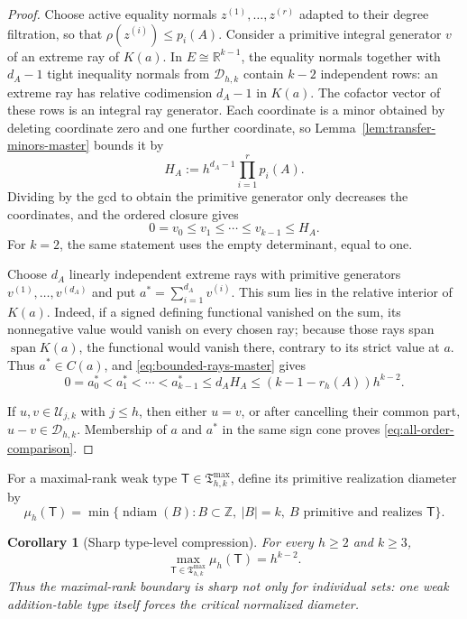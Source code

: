 \documentclass[11pt,reqno]{amsart}
\newtheorem{corollary}[theorem]{Corollary}
\theoremstyle{definition}
\theoremstyle{remark}
\newcommand{\ndiam}{\operatorname{ndiam}}
\begin{document}
\begin{proof}
Choose active equality normals $z^{(1)},\ldots,z^{(r)}$ adapted to their
degree filtration, so that $\rho(z^{(i)})\leq p_i(A)$.  Consider a primitive
integral generator $v$ of an extreme ray of $K(a)$.  In
$E\cong\mathbb R^{k-1}$, the equality normals together with $d_A-1$ tight
inequality normals from $\mathcal D_{h,k}$ contain $k-2$ independent rows:
an extreme ray has relative codimension $d_A-1$ in $K(a)$.
The cofactor vector of these rows is an integral ray generator.  Each
coordinate is a minor obtained by deleting coordinate zero and one further
coordinate, so Lemma~\ref{lem:transfer-minors-master} bounds it by
\[
 H_A:=h^{d_A-1}\prod_{i=1}^r p_i(A).
\]
Dividing by the gcd to obtain the primitive generator only decreases the
coordinates, and the ordered closure gives
\begin{equation}\label{eq:bounded-rays-master}
 0=v_0\leq v_1\leq\cdots\leq v_{k-1}\leq H_A.
\end{equation}
For $k=2$, the same statement uses the empty determinant, equal to one.

Choose $d_A$ linearly independent extreme rays with primitive generators
$v^{(1)},\ldots,v^{(d_A)}$ and put
$a^*=\sum_{i=1}^{d_A}v^{(i)}$.  This sum lies in the relative interior of
$K(a)$.  Indeed, if a signed defining functional vanished on the sum, its
nonnegative value would vanish on every chosen ray; because those rays span
$\operatorname{span}K(a)$, the functional would vanish there, contrary to
its strict value at $a$.  Thus $a^*\in C(a)$, and
\eqref{eq:bounded-rays-master} gives
\[
 0=a_0^*<a_1^*<\cdots<a_{k-1}^*
 \leq d_AH_A
 \leq(k-1-r_h(A))h^{k-2}.
\]

If $u,v\in\mathcal U_{j,k}$ with $j\leq h$, then either $u=v$, or after
cancelling their common part, $u-v\in\mathcal D_{h,k}$.  Membership of $a$
and $a^*$ in the same sign cone proves \eqref{eq:all-order-comparison}.
\end{proof}

For a maximal-rank weak type
$\mathsf T\in\mathfrak T^{\max}_{h,k}$, define its primitive realization
diameter by
\[
 \mu_h(\mathsf T)=
 \min\{\ndiam(B):B\subset\mathbb Z,\ |B|=k,\ B\text{ primitive and realizes }
 \mathsf T\}.
\]

\begin{corollary}[Sharp type-level compression]
\label{cor:sharp-type-compression}
For every $h\geq2$ and $k\geq3$,
\begin{equation}\label{eq:sharp-type-compression}
 \max_{\mathsf T\in\mathfrak T^{\max}_{h,k}}\mu_h(\mathsf T)=h^{k-2}.
\end{equation}
Thus the maximal-rank boundary is sharp not only for individual sets: one
weak addition-table type itself forces the critical normalized diameter.
\end{corollary}
\end{document}
